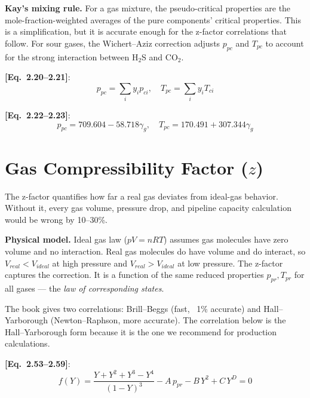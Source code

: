 \documentclass[11pt,a4paper,openany]{book}
\newcommand{\eqrefbook}[1]{\textcolor{blue!60!black}{\textbf{[Eq.~#1]}}}
\begin{document}
\begin{theory}
\textbf{Kay's mixing rule.} For a gas mixture, the pseudo-critical
properties are the mole-fraction-weighted averages of the pure
components' critical properties. This is a simplification, but it is
accurate enough for the z-factor correlations that follow. For sour
gases, the Wichert--Aziz correction adjusts $p_{pc}$ and $T_{pc}$ to
account for the strong interaction between H$_2$S and CO$_2$.
\end{theory}

\eqrefbook{2.20--2.21}:
\begin{equation}
  p_{pc} = \sum_i y_i p_{ci},\quad
  T_{pc} = \sum_i y_i T_{ci}
\end{equation}

\eqrefbook{2.22--2.23}:
\begin{equation}
  p_{pc} = 709.604 - 58.718\gamma_g,\quad
  T_{pc} = 170.491 + 307.344\gamma_g
\end{equation}

\section{Gas Compressibility Factor ($z$)}

\begin{purpose}
The z-factor quantifies how far a real gas deviates from ideal-gas
behavior. Without it, every gas volume, pressure drop, and pipeline
capacity calculation would be wrong by 10--30\%.
\end{purpose}

\begin{theory}
\textbf{Physical model.} Ideal gas law ($pV = nRT$) assumes gas
molecules have zero volume and no interaction. Real gas molecules do
have volume and do interact, so $V_{real} < V_{ideal}$ at high
pressure and $V_{real} > V_{ideal}$ at low pressure. The z-factor
captures the correction. It is a function of the same reduced
properties $p_{pr}, T_{pr}$ for all gases — the \emph{law of
corresponding states}.

The book gives two correlations: Brill--Beggs (fast, ~1\%
accurate) and Hall--Yarborough (Newton--Raphson, more accurate). The
correlation below is the Hall--Yarborough form because it is the one
we recommend for production calculations.
\end{theory}

\eqrefbook{2.53--2.59}:
\begin{equation}
  f(Y) = \frac{Y + Y^2 + Y^3 - Y^4}{(1 - Y)^3}
       - A\,p_{pr} - B\,Y^2 + C\,Y^D = 0
\end{equation}
\end{document}
